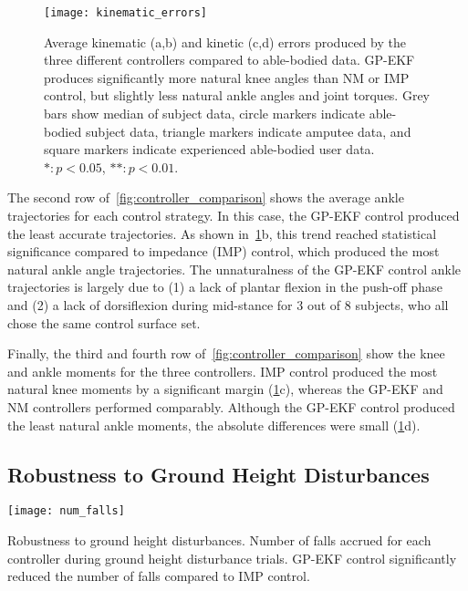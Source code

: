 \begin{figure}[t]
   \centering \texttt{[image: kinematic\_errors]}
   \caption[Average kinematic and kinetic errors]{Average kinematic (a,b) and
   kinetic (c,d) errors produced by the three different controllers compared to
   able-bodied data. GP-EKF produces significantly more natural knee angles than
   NM or IMP control, but slightly less natural ankle angles and joint torques.
   Grey bars show median of subject data, circle markers indicate able-bodied
   subject data, triangle markers indicate amputee data, and square markers
   indicate experienced able-bodied user data. $*: p < 0.05$, $**: p <
   0.01$.}\label{fig:kinematic_errors}
\end{figure}
The second row of~\cref{fig:controller_comparison} shows the average ankle
trajectories for each control strategy. In this case, the GP-EKF control
produced the least accurate trajectories. As shown
in~\cref{fig:kinematic_errors}b, this trend reached statistical significance
compared to impedance (IMP) control, which produced the most natural ankle angle
trajectories. The unnaturalness of the GP-EKF control ankle trajectories is
largely due to (1) a lack of plantar flexion in the push-off phase and (2) a
lack of dorsiflexion during mid-stance for 3 out of 8 subjects, who all chose
the same control surface set.

Finally, the third and fourth row of~\cref{fig:controller_comparison} show the
knee and ankle moments for the three controllers. IMP control produced the most
natural knee moments by a significant margin (\cref{fig:kinematic_errors}c),
whereas the GP-EKF and NM controllers performed comparably. Although the GP-EKF
control produced the least natural ankle moments, the absolute differences were
small (\cref{fig:kinematic_errors}d).

\subsection{Robustness to Ground Height Disturbances}
\begin{marginfigure}
    \centering
    \texttt{[image: num\_falls]} 
    \caption[Robustness to ground height disturbances]{Robustness to ground
    height disturbances. Number of falls accrued for each controller during
    ground height disturbance trials. GP-EKF control significantly reduced the
    number of falls compared to IMP control.}\label{fig:num_block_falls}
\end{marginfigure}

